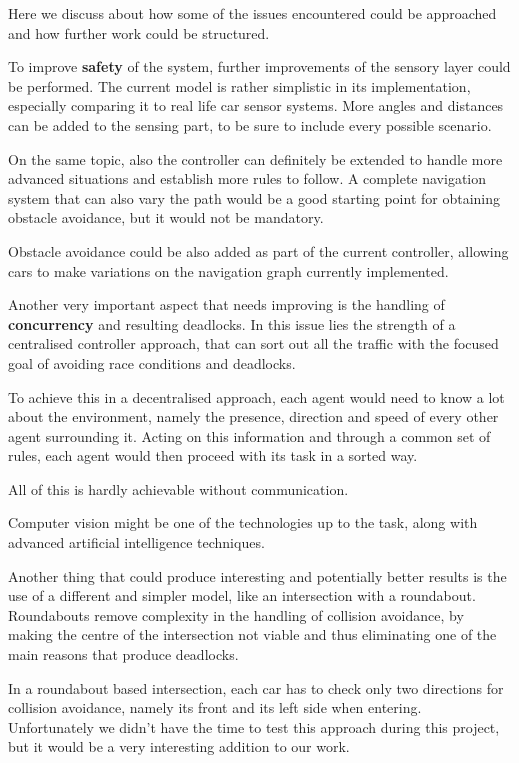 Here we discuss about how some of the issues encountered could be approached and how further work could be structured.

To improve \textbf{safety} of the system, further improvements of the sensory layer could be performed.
The current model is rather simplistic in its implementation, especially comparing it to real life car sensor systems.
More angles and distances can be added to the sensing part, to be sure to include every possible scenario.

On the same topic, also the controller can definitely be extended to handle more advanced situations and establish more rules to follow. 
A complete navigation system that can also vary the path would be a good starting point for obtaining obstacle avoidance, but it would not be mandatory.

Obstacle avoidance could be also added as part of the current controller, allowing cars to make variations on the navigation graph currently implemented.
\newline

Another very important aspect that needs improving is the handling of \textbf{concurrency} and resulting deadlocks.
In this issue lies the strength of a centralised controller approach, that can sort out all the traffic with the focused goal of avoiding race conditions and deadlocks.

To achieve this in a decentralised approach, each agent would need to know a lot about the environment, namely the presence, direction and speed of every other agent surrounding it.
Acting on this information and through a common set of rules, each agent would then proceed with its task in a sorted way.

All of this is hardly achievable without communication.

Computer vision might be one of the technologies up to the task, along with advanced artificial intelligence techniques.
\newline

Another thing that could produce interesting and potentially better results is the use of a different and simpler model, like an intersection with a roundabout.
Roundabouts remove complexity in the handling of collision avoidance, by making the centre of the intersection not viable and thus eliminating one of the main reasons that produce deadlocks.

In a roundabout based intersection, each car has to check only two directions for collision avoidance, namely its front and its left side when entering.
Unfortunately we didn't have the time to test this approach during this project, but it would be a very interesting addition to our work.
\newline

